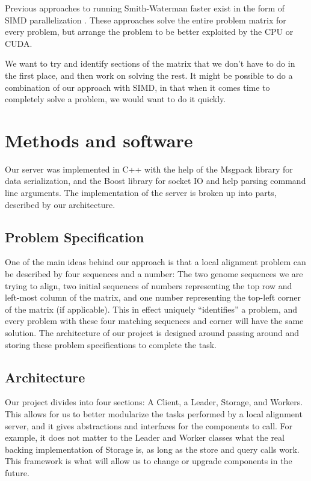 \documentclass[11pt]{article}
\begin{document}
Previous approaches to running Smith-Waterman faster exist in the form of SIMD parallelization \cite{Rognes:11}. These approaches solve the entire problem matrix for every problem, but arrange the problem to be better exploited by the CPU or CUDA. 

We want to try and identify sections of the matrix that we don't have to do in the first place, and then work on solving the rest. It might be possible to do a combination of our approach with SIMD, in that when it comes time to completely solve a problem, we would want to do it quickly.



\section{Methods and software}

Our server was implemented in C++ with the help of the Msgpack library for data serialization, and the Boost library for socket IO and help parsing command line arguments. The implementation of the server is broken up into parts, described by our architecture.

\subsection{Problem Specification}
One of the main ideas behind our approach is that a local alignment problem can be described by four sequences and a number: The two genome sequences we are trying to align, two initial sequences of numbers representing the top row and left-most column of the matrix, and one number representing the top-left corner of the matrix (if applicable). This in effect uniquely ``identifies'' a problem, and every problem with these four matching sequences and corner will have the same solution. The architecture of our project is designed around passing around and storing these problem specifications to complete the task.


\subsection{Architecture}
Our project divides into four sections: A Client, a Leader, Storage, and Workers. This allows for us to better modularize the tasks performed by a local alignment server, and it gives abstractions and interfaces for the components to call. For example, it does not matter to the Leader and Worker classes what the real backing implementation of Storage is, as long as the store and query calls work. This framework is what will allow us to change or upgrade components in the future. 
\end{document}
